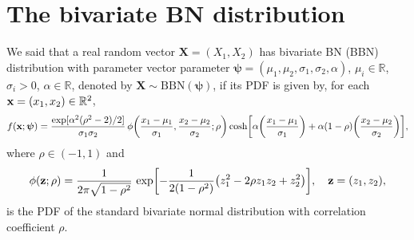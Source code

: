 \documentclass[12pt]{article}
\theoremstyle{definition}
\begin{document}
\section{The bivariate BN distribution}\label{sec:bivariate}
We said that a real random vector $\boldsymbol{X}=(X_1,X_2)$ has bivariate BN (BBN) distribution with parameter vector parameter $\boldsymbol{\psi }=(\mu_1,\mu_2,\sigma_1,\sigma_2,\alpha)$, $\mu_i\in\mathbb{R}$, $\sigma_i>0$, $\alpha\in \mathbb{R}$, denoted by $\boldsymbol{X}\sim \text{BBN}(\boldsymbol{\psi })$, if its PDF is given by, for each  ${\bf x}=(x_1, x_2)\in\mathbb{R}^2$,
\begin{eqnarray*}%
f({\bf x};\boldsymbol{\psi })
=
{\exp[{\alpha^2(\rho^2-2)/ 2}]\over\sigma_1\sigma_2}\,
\phi\biggl({x_1-\mu_1\over \sigma_1},{x_2-\mu_2\over \sigma_2};\rho\biggr)
\cosh
\biggl[ \alpha\biggl({x_1-\mu_1\over \sigma_1}\biggr)+ \alpha(1-\rho)\biggl({x_2-\mu_2\over \sigma_2}\biggr) \biggr],
\end{eqnarray*}
where $\rho\in(-1,1)$  and
\begin{align*}
\phi({\bf z};\rho)=\dfrac{1}{2\pi\sqrt{1-\rho^2}}\,
\exp\biggl[-{1\over 2 (1-\rho^2)}\big( 
z_1^2 - 2\rho z_1z_2  +z_2^2
\big)\biggr],
\quad {\bf z}=(z_1,z_2),
\end{align*}
is the  PDF of the standard bivariate normal distribution with correlation coefficient $\rho$.
\end{document}
